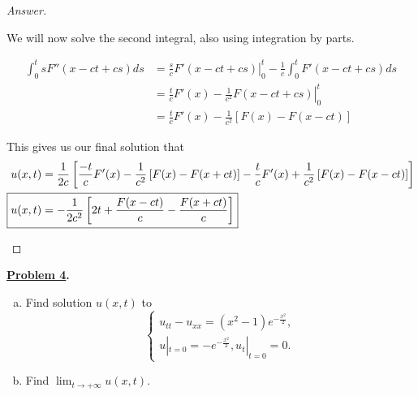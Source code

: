 \documentclass{article}
\theoremstyle{definition}
\renewcommand\qedsymbol{$\blacksquare$}
\newenvironment{ans}{\begin{proof}[Answer]\renewcommand{\qedsymbol}{}}{\end{proof}}
\newenvironment{boldenv}{\bfseries\boldmath}{}
\begin{document}
\begin{ans}
\begin{enumerate}[(1), series=answers]
            We will now solve the second integral, also using integration by parts.

            \begin{align*}
            \int_0^tsF''(x-ct+cs)ds &= \left.\frac{s}{c}F'(x-ct+cs)\right|_0^t - \frac{1}{c}\int_0^t F'(x-ct+cs)ds\\
            &= \frac{t}{c}F'(x) - \left.\frac{1}{c^2}F(x-ct+cs)\right|^t_0\\
            &= \frac{t}{c}F'(x) - \frac{1}{c^2}\left[F(x) - F(x-ct)\right]
            \end{align*}

            This gives us our final solution that 
            \begin{align*}
            u(x,t) &= \frac{1}{2c}\left[ \frac{-t}{c}F'(x) - \frac{1}{c^2}\left[F(x) - F(x+ct)\right] - \frac{t}{c}F'(x) + \frac{1}{c^2}\left[F(x) - F(x-ct)\right] \right]\\
            \Aboxed{u(x,t) &= -\frac{1}{2c^2}\left[2t + \frac{F(x-ct)}{c} - \frac{F(x+ct)}{c}\right]}
            \end{align*}
		\end{enumerate}
	\end{ans}

    \begin{boldenv}
    \underline{Problem 4}.
    \begin{enumerate}[a)]
        \item Find solution $u(x,t)$ to
        \[\begin{cases}
            u_{tt} - u_{xx} = (x^2 - 1)e^{-\frac{x^2}{2}},\\
            u|_{t=0} = -e^{-\frac{x^2}{2}}, u_t|_{t=0} = 0.
        \end{cases}\]

        \item Find $\lim_{t\to +\infty} u(x,t).$
    \end{enumerate}
    \end{boldenv}
\end{document}
